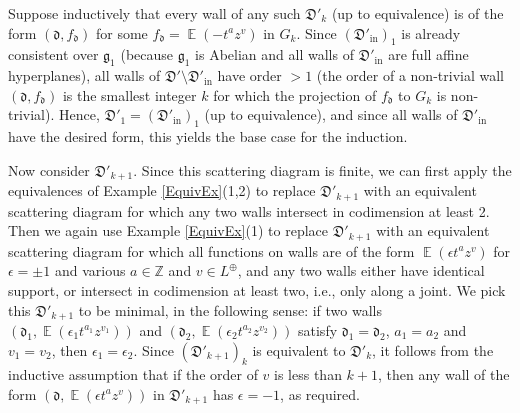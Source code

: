 \documentclass{amsart}
\DeclareMathOperator{\In}{in}
\DeclareMathOperator{\EE}{\mathbb{E}}
\let\bb=\mathbb
\let\f=\mathfrak
\theoremstyle{plain}%
\theoremstyle{definition}
\theoremstyle{remark}
\begin{document}
Suppose inductively that every wall of any such $\f{D}'_k$ (up to equivalence) is of the form $(\f{d},f_{\f{d}})$ for some $f_{\f{d}}=\EE(-t^az^v)$ in $G_k$.   Since $(\f{D}'_{\In})_1$ is already consistent over $\f{g}_1$ (because $\f{g}_1$ is Abelian and all walls of $\f{D}'_{\In}$ are full affine hyperplanes), all walls of $\f{D}'\setminus \f{D}'_{\In}$ have order $>1$ (the order of a non-trivial wall $(\f{d},f_{\f{d}})$ is the smallest integer $k$ for which the projection of $f_{\f{d}}$ to $G_k$ is non-trivial).  Hence, $\f{D}'_1=(\f{D}'_{\In})_1$ (up to equivalence), and since all walls of $\f{D}'_{\In}$ have the desired form, this yields the base case for the induction.



Now consider $\f{D}'_{k+1}$.  Since this scattering diagram is finite, we can first apply the equivalences of Example \ref{EquivEx}(1,2) to replace $\f{D}'_{k+1}$ with an equivalent scattering diagram for which any two walls intersect in codimension at least 2.  Then we again use Example \ref{EquivEx}(1) to replace $\f{D}'_{k+1}$ with an equivalent scattering diagram for which all functions on walls are of the form $\EE(\epsilon t^az^v)$ for $\epsilon= \pm 1$ and various $a\in\bb{Z}$ and $v\in L^{\oplus}$, and any two walls either have identical support, or intersect in codimension at least two, i.e., only along a joint.  We pick this $\f{D}'_{k+1}$ to be minimal, in the following sense: if two walls $(\f{d}_1,\EE(\epsilon_1 t^{a_1}z^{v_1}))$ and $(\f{d}_2,\EE(\epsilon_2 t^{a_2}z^{v_2}))$ satisfy $\f{d}_1=\f{d}_2$, $a_1=a_2$ and $v_1=v_2$, then $\epsilon_1=\epsilon_2$.  Since $(\f{D}'_{k+1})_k$ is equivalent to $\f{D}'_k$, it follows from the inductive assumption that if the order of $v$ is less than $k+1$, then any wall of the form $(\f{d},\EE(\epsilon t^{a}z^{v}))$ in $\f{D}'_{k+1}$ has $\epsilon=-1$, as required.  
\end{document}

